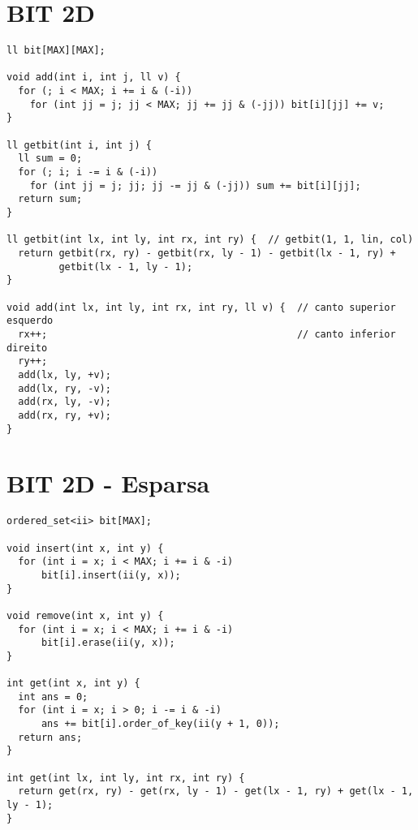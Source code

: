 \documentclass[a4paper]{article}
\begin{document}
\section{BIT 2D}
\begin{lstlisting}
ll bit[MAX][MAX];

void add(int i, int j, ll v) {
  for (; i < MAX; i += i & (-i))
    for (int jj = j; jj < MAX; jj += jj & (-jj)) bit[i][jj] += v;
}

ll getbit(int i, int j) {
  ll sum = 0;
  for (; i; i -= i & (-i))
    for (int jj = j; jj; jj -= jj & (-jj)) sum += bit[i][jj];
  return sum;
}

ll getbit(int lx, int ly, int rx, int ry) {  // getbit(1, 1, lin, col)
  return getbit(rx, ry) - getbit(rx, ly - 1) - getbit(lx - 1, ry) +
         getbit(lx - 1, ly - 1);
}

void add(int lx, int ly, int rx, int ry, ll v) {  // canto superior esquerdo
  rx++;                                           // canto inferior direito
  ry++;
  add(lx, ly, +v);
  add(lx, ry, -v);
  add(rx, ly, -v);
  add(rx, ry, +v);
}
\end{lstlisting}
\section{BIT 2D - Esparsa}
\begin{lstlisting}
ordered_set<ii> bit[MAX];

void insert(int x, int y) {
  for (int i = x; i < MAX; i += i & -i)
      bit[i].insert(ii(y, x));
}

void remove(int x, int y) {
  for (int i = x; i < MAX; i += i & -i)
      bit[i].erase(ii(y, x));
}

int get(int x, int y) {
  int ans = 0;
  for (int i = x; i > 0; i -= i & -i)
      ans += bit[i].order_of_key(ii(y + 1, 0));
  return ans;
}

int get(int lx, int ly, int rx, int ry) {
  return get(rx, ry) - get(rx, ly - 1) - get(lx - 1, ry) + get(lx - 1, ly - 1);
}
 \end{lstlisting}
\end{document}

